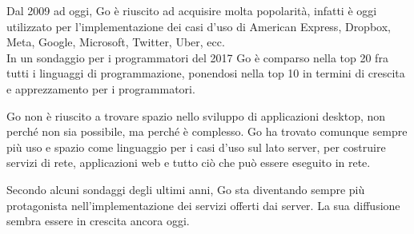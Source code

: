 \documentclass[../thesis.tex]{subfiles}
\begin{document}
    Dal 2009 ad oggi, Go è riuscito ad acquisire molta popolarità, infatti è oggi utilizzato per l'implementazione dei casi d'uso di American Express, Dropbox, Meta, Google, Microsoft, Twitter, Uber, ecc. \\
    In un sondaggio per i programmatori del 2017 Go è comparso nella top 20 fra tutti i linguaggi di programmazione, ponendosi nella top 10 in termini di crescita e apprezzamento per i programmatori.
    \hfill \vspace{12pt}

    Go non è riuscito a trovare spazio nello sviluppo di applicazioni desktop, non perché non sia possibile, ma perché è complesso.
    Go ha trovato comunque sempre più uso e spazio come linguaggio per i casi d'uso sul lato server, per costruire servizi di rete, applicazioni web e tutto ciò che può essere eseguito in rete.
    \hfill \vspace{12pt}

    Secondo alcuni sondaggi degli ultimi anni, Go sta diventando sempre più protagonista nell'implementazione dei servizi offerti dai server.
    La sua diffusione sembra essere in crescita ancora oggi.
    \clearpage
\end{document}
